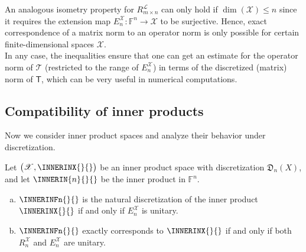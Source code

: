 \documentclass[a4paper]{paper}
\newcommand*{\SPC}[1]{{\ensuremath{\mathscr{#1}}}}
\newcommand*{\SPCL}{\SPC{L}}
\newcommand*{\SPCX}{\SPC{X}}
\newcommand{\FIELD}{{\ensuremath{\mathbb{F}}}}
\newcommand*{\Fn}{{\ensuremath{\FIELD^n}}}
\newcommand*{\OP}[1]{{\ensuremath{\mathcal{#1}}}}
\newcommand*{\OPT}{\OP{T}}
\newcommand{\DISCOP}[1]{{\ensuremath{\mathsf{#1}}}}
\newcommand*{\DISCOPT}{\DISCOP{T}}
\newcommand*{\EXT}[2]{\ensuremath{E_{#1}^{#2}}}
\newcommand*{\REST}[2]{\ensuremath{R_{#1}^{#2}}}
\newcommand*{\RnX}{{\ensuremath{\REST{n}{\SPC{X}}}}}
\newcommand*{\EnX}{{\ensuremath{\EXT{n}{\SPC{X}}}}}
\newcommand*{\DISCR}[2]{{\ensuremath{\mathfrak{D}_{#2}(#1)}}}
\newcommand*{\DISCRnX}{\DISCR{X}{n}}
\DeclareMathOperator{\DIM}{dim}
\begin{document}
\begin{remark}
 \label{remark:prop:norm:op_norm_corresp}
 An analogous isometry property for $\REST{m\times n}{\SPCL}$ can only hold if $\DIM(\SPCX) \leq n$ 
 since it requires the extension map $\EnX \colon \Fn \to \SPCX$ to be surjective. Hence, exact correspondence 
 of a matrix norm to an operator norm is only possible for certain finite-dimensional spaces $\SPCX$.\\
 In any case, the inequalities ensure that one can get an estimate for the operator norm of $\OPT$ (restricted to the 
 range of $\EnX$) in terms of the discretized (matrix) norm of $\DISCOPT$, which can be very useful in numerical 
 computations.
\end{remark}



\subsection{Compatibility of inner products}
\label{subsec:prop:inner}

Now we consider inner product spaces and analyze their behavior under discretization.


\begin{lemma}
 \label{lemma:prop:inner:natural_corresp}
 Let $\big( \SPCX, \INNERINX{}{} \big)$ be an inner product space with discretization $\DISCRnX$, and 
 let $\INNERIN{n}{}{}$ be the inner product in $\Fn$.
 \begin{enumerate}[(a)]
  \item \label{lemma:prop:inner:natural_corresp:a_natural}
  $\INNERINFn{}{}$ is the natural discretization of the inner product $\INNERINX{}{}$ if and 
  only if $\EnX$ is unitary.
  
  \item \label{lemma:prop:inner:natural_corresp:b_corresp}
  $\INNERINFn{}{}$ exactly corresponds to $\INNERINX{}{}$ if and only if both $\RnX$ and 
  $\EnX$ are unitary.
 \end{enumerate}
\end{lemma}
\vspace{1em}
\end{document}

